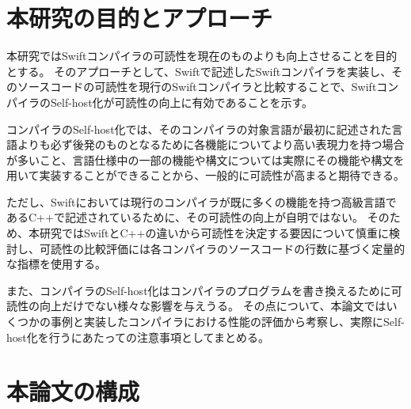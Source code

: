 \section{本研究の目的とアプローチ}
\label{introduction:purpose}

本研究ではSwiftコンパイラの可読性を現在のものよりも向上させることを目的とする。
そのアプローチとして、Swiftで記述したSwiftコンパイラを実装し、そのソースコードの可読性を現行のSwiftコンパイラと比較することで、SwiftコンパイラのSelf-host化が可読性の向上に有効であることを示す。

コンパイラのSelf-host化では、そのコンパイラの対象言語が最初に記述された言語よりも必ず後発のものとなるために各機能についてより高い表現力を持つ場合が多いこと、言語仕様中の一部の機能や構文については実際にその機能や構文を用いて実装することができることから、一般的に可読性が高まると期待できる。

ただし、Swiftにおいては現行のコンパイラが既に多くの機能を持つ高級言語であるC++で記述されているために、その可読性の向上が自明ではない。
そのため、本研究ではSwiftとC++の違いから可読性を決定する要因について慎重に検討し、可読性の比較評価には各コンパイラのソースコードの行数に基づく定量的な指標を使用する。

また、コンパイラのSelf-host化はコンパイラのプログラムを書き換えるために可読性の向上だけでない様々な影響を与えうる。
その点について、本論文ではいくつかの事例と実装したコンパイラにおける性能の評価から考察し、実際にSelf-host化を行うにあたっての注意事項としてまとめる。

%

\section{本論文の構成}

